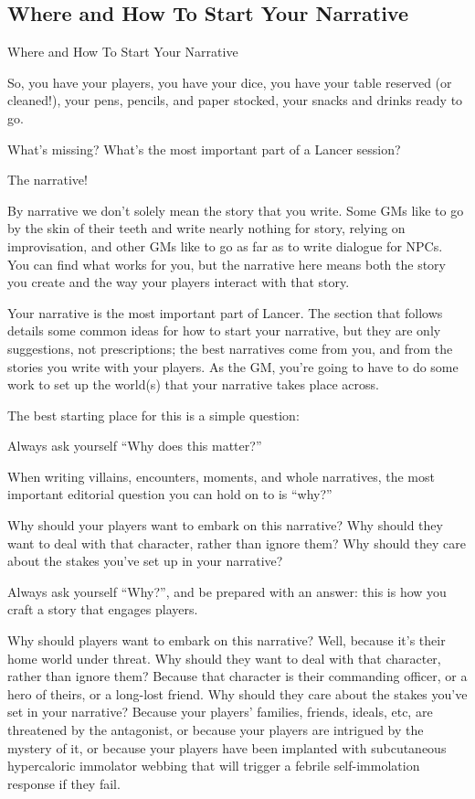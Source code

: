 \subsection{Where and How To Start Your Narrative}

                          Where and How To Start Your Narrative

So, you have your players, you have your dice, you have your table reserved (or cleaned!), your
pens, pencils, and paper stocked, your snacks and drinks ready to go.


What’s missing? What’s the most important part of a Lancer session?


The narrative!





By narrative we don’t solely mean the story that you write. Some GMs like to go by the skin of
their teeth and write nearly nothing for story, relying on improvisation, and other GMs like to go
as far as to write dialogue for NPCs. You can find what works for you, but the narrative here
means both the story you create and the way your players interact with that story.


Your narrative is the most important part of Lancer. The section that follows details some
common ideas for how to start your narrative, but they are only suggestions, not prescriptions;
the best narratives come from you, and from the stories you write with your players. As the GM,
you’re going to have to do some work to set up the world(s) that your narrative takes place
across.


The best starting place for this is a simple question:


Always ask yourself  “Why does this matter?”

When writing villains, encounters, moments, and whole narratives, the most important editorial
question you can hold on to is “why?”


Why should your players want to embark on this narrative? Why should they want to deal with
that character, rather than ignore them? Why should they care about the stakes you’ve set up in
your narrative?


Always ask yourself “Why?”, and be prepared with an answer: this is how you craft a story that
engages players.


Why should players want to embark on this narrative? Well, because it’s their home world under
threat. Why should they want to deal with that character, rather than ignore them? Because that
character is their commanding officer, or a hero of theirs, or a long-lost friend. Why should they
care about the stakes you’ve set in your narrative? Because your players’ families, friends,
ideals, etc, are threatened by the antagonist, or because your players are intrigued by the
mystery of it, or because your players have been implanted with subcutaneous hypercaloric
immolator webbing that will trigger a febrile self-immolation response if they fail.


